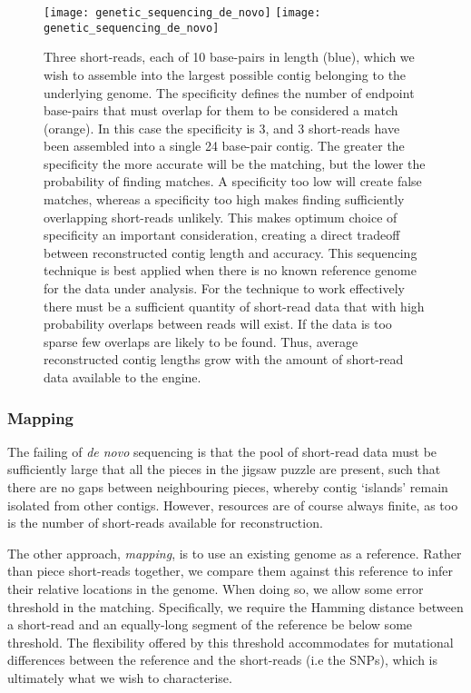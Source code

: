 \begin{figure}[!htbp]
\pubmode
	\texttt{[image: genetic\_sequencing\_de\_novo]}
\else
	\texttt{[image: genetic\_sequencing\_de\_novo]}
\fi
	\captionspacefig \caption{Three short-reads, each of 10 base-pairs in length (blue), which we wish to assemble into the largest possible contig belonging to the underlying genome. The specificity defines the number of endpoint base-pairs that must overlap for them to be considered a match (orange). In this case the specificity is 3, and 3 short-reads have been assembled into a single 24 base-pair contig. The greater the specificity the more accurate will be the matching, but the lower the probability of finding matches. A specificity too low will create false matches, whereas a specificity too high makes finding sufficiently overlapping short-reads unlikely. This makes optimum choice of specificity an important consideration, creating a direct tradeoff between reconstructed contig length and accuracy. This sequencing technique is best applied when there is no known reference genome for the data under analysis. For the technique to work effectively there must be a sufficient quantity of short-read data that with high probability overlaps between reads will exist. If the data is too sparse few overlaps are likely to be found. Thus, average reconstructed contig lengths grow with the amount of short-read data available to the engine.} \label{fig:gen_seq_de_novo}
\end{figure}

%
%

\subsubsection{Mapping}

The failing of \textit{de novo} sequencing is that the pool of short-read data must be sufficiently large that all the pieces in the jigsaw puzzle are present, such that there are no gaps between neighbouring pieces, whereby contig `islands' remain isolated from other contigs. However, resources are of course always finite, as too is the number of short-reads available for reconstruction.

The other approach, \textit{mapping}, is to use an existing genome as a reference. Rather than piece short-reads together, we compare them against this reference to infer their relative locations in the genome. When doing so, we allow some error threshold in the matching. Specifically, we require the Hamming distance between a short-read and an equally-long segment of the reference be below some threshold. The flexibility offered by this threshold accommodates for mutational differences between the reference and the short-reads (i.e the SNPs), which is ultimately what we wish to characterise.

